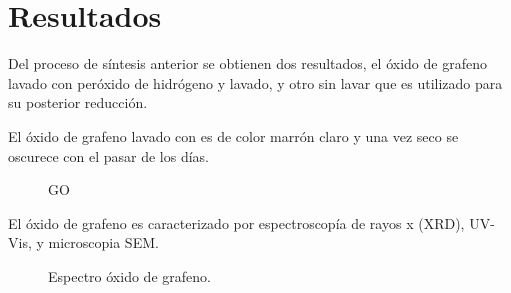 \section{Resultados}
Del proceso de síntesis anterior se obtienen dos resultados, el óxido de grafeno lavado con peróxido de hidrógeno y lavado, y otro sin lavar que es utilizado para su posterior reducción.

El óxido de grafeno lavado con  es de color marrón claro y una vez seco se oscurece con el pasar de los días.

\begin{figure}
	\centering
	\caption{GO}
	\label{fig:GO}
\end{figure}

El óxido de grafeno es caracterizado por espectroscopía de rayos x (XRD), UV-Vis, y microscopia SEM.

\begin{figure}
	\centering
	\caption{Espectro óxido de grafeno.}
	\label{fig:xrd_GO}
\end{figure}